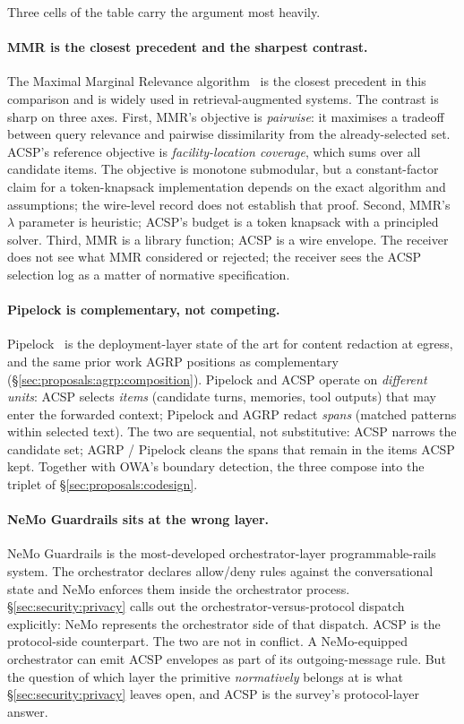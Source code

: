Three cells of the table carry the argument most heavily.

\paragraph{MMR is the closest precedent and the sharpest contrast.}
The Maximal Marginal Relevance
algorithm~\cite{mmr_carbonell} is the closest precedent
in this comparison and is widely used in
retrieval-augmented systems. The contrast is
sharp on three axes. First, MMR's objective is
\emph{pairwise}: it maximises a tradeoff between query
relevance and pairwise dissimilarity from the
already-selected set. ACSP's reference objective is
\emph{facility-location coverage}, which sums over all
candidate items. The objective is monotone submodular, but
a constant-factor claim for a token-knapsack implementation
depends on the exact algorithm and assumptions; the
wire-level record does not establish that proof. Second, MMR's
\(\lambda\) parameter is heuristic; ACSP's budget is a
token knapsack with a principled solver. Third, MMR is a
library function; ACSP is a wire envelope. The receiver
does not see what MMR considered or rejected; the
receiver sees the ACSP selection log as a matter of
normative specification.

\paragraph{Pipelock is complementary, not competing.}
Pipelock~\cite{pipelock} is the deployment-layer state of
the art for content redaction at egress, and the same
prior work AGRP positions as complementary
(\S\ref{sec:proposals:agrp:composition}). Pipelock and
ACSP operate on \emph{different units}: ACSP selects
\emph{items} (candidate turns, memories, tool outputs)
that may enter the forwarded context; Pipelock and AGRP
redact \emph{spans} (matched patterns within selected
text). The two are sequential, not substitutive: ACSP
narrows the candidate set; AGRP / Pipelock cleans the
spans that remain in the items ACSP kept. Together with
OWA's boundary detection, the three compose into the
triplet of \S\ref{sec:proposals:codesign}.

\paragraph{NeMo Guardrails sits at the wrong layer.}
NeMo Guardrails is the most-developed
orchestrator-layer programmable-rails system. The
orchestrator declares allow/deny rules against the
conversational state and NeMo enforces them inside the
orchestrator process. \S\ref{sec:security:privacy} calls
out the orchestrator-versus-protocol dispatch
explicitly: NeMo represents the orchestrator side of
that dispatch. ACSP is the protocol-side counterpart.
The two are not in conflict. A NeMo-equipped
orchestrator can emit ACSP envelopes as part of its
outgoing-message rule. But the question of which
layer the primitive \emph{normatively} belongs at is
what \S\ref{sec:security:privacy} leaves open, and ACSP
is the survey's protocol-layer answer.


